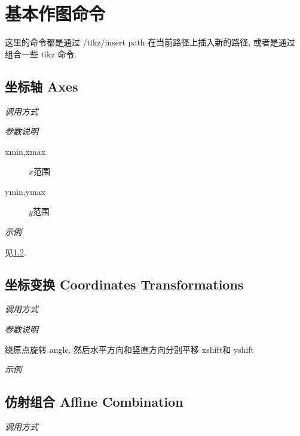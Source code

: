 \chapter{基本作图命令}

这里的命令都是通过 /tikz/insert path\cite{PATH} 在当前路径上插入新的路径, 或者是通过  组合一些 tikz 命令.

\section{坐标轴 Axes}

\emph{调用方式}

\begin{tcolorbox}{}
\end{tcolorbox}

\emph{参数说明}

\begin{description}
  \item[xmin,xmax] $x$范围
  \item[ymin,ymax] $y$范围
\end{description}

\emph{示例}

见\ref{sec:transform}.

\section{坐标变换 Coordinates Transformations}\label{sec:transform}

\emph{调用方式}

\begin{tcolorbox}{}
\end{tcolorbox}

\emph{参数说明}

绕原点旋转 angle, 然后水平方向和竖直方向分别平移 xshift和 yshift

\emph{示例}


\section{仿射组合 Affine Combination}

\emph{调用方式}

\begin{tcolorbox}{}
\end{tcolorbox}

